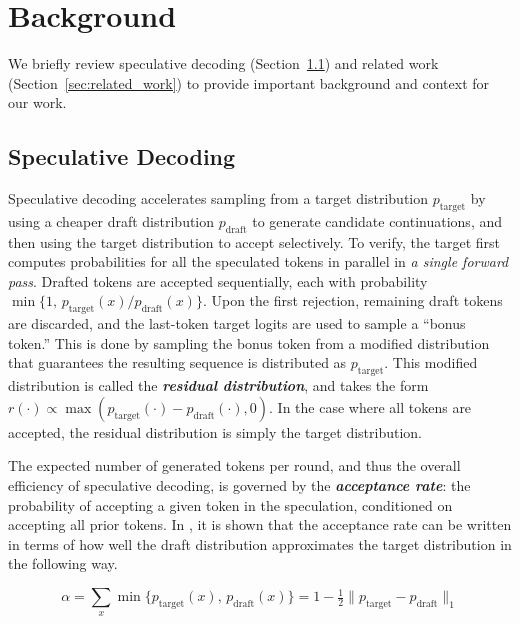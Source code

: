 \section{Background}
\label{sec:background}

We briefly review speculative decoding (Section~\ref{sec:background_specdec}) and related work (Section~\ref{sec:related_work}) to provide important background and context for our work.

\subsection{Speculative Decoding}
\label{sec:background_specdec}

Speculative decoding accelerates sampling from a target distribution \(p_{\mathrm{target}}\) by using a cheaper draft distribution \(p_{\mathrm{draft}}\) to generate candidate continuations, and then using the target distribution to accept selectively.
To verify, the target first computes probabilities for all the speculated tokens in parallel in \textit{a single forward pass}.
Drafted tokens are accepted sequentially, each with probability
\(\min\{1,\,p_{\mathrm{target}}(x)/p_{\mathrm{draft}}(x)\}\).
Upon the first rejection, remaining draft tokens are discarded, and the last-token target logits are used to sample a ``bonus token.''
This is done by sampling the bonus token from a modified distribution that guarantees the resulting sequence is distributed as \(p_{\mathrm{target}}\).
This modified distribution is called the \textbf{\textit{residual distribution}}, and takes the form \(r(\cdot) \propto \max\left(p_{\mathrm{target}}(\cdot)-p_{\mathrm{draft}}(\cdot), 0\right)\).
In the case where all tokens are accepted, the residual distribution is simply the target distribution.

The expected number of generated tokens per round, and thus the overall efficiency of speculative decoding, is governed by the \textbf{\textit{acceptance rate}}:
the probability of accepting a given token in the speculation, conditioned on accepting all prior tokens.
In \citep{leviathan2023}, it is shown that the acceptance rate can be written in terms of how well the draft distribution approximates the target distribution in the following way. 

\begin{theorem} \citep{leviathan2023}
    \label{thm:l1}
    $$\alpha = \sum_x \min\{p_{\mathrm{target}}(x),\,p_{\mathrm{draft}}(x)\} = 1 - \tfrac{1}{2}\lVert p_{\mathrm{target}} - p_{\mathrm{draft}} \rVert_1$$
\end{theorem}


